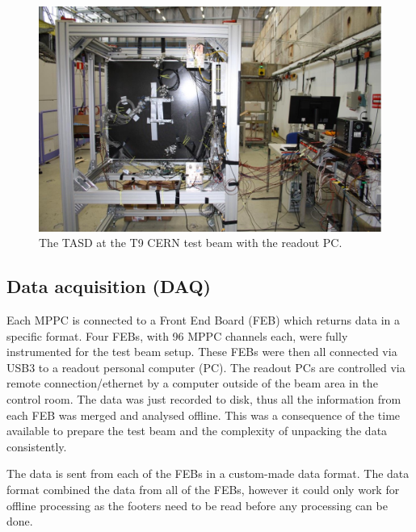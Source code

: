 \begin{figure}[h!]
\centering
\includegraphics[width=\textwidth]{figures/TASDinstrumented.jpeg}
\caption{The TASD at the T9 CERN test beam with the readout PC.}
\label{fig:TASDreal}
\end{figure}

\subsection{Data acquisition (DAQ)}
Each MPPC is connected to a Front End Board (FEB) which returns data in a specific format. Four FEBs, with 96 MPPC channels each, were fully instrumented for the test beam setup. These FEBs were then all connected via USB3 to a readout personal computer (PC). The readout PCs are controlled via remote connection/ethernet by a computer outside of the beam area in the control room. The data was just recorded to disk, thus all the information from each FEB was merged and analysed offline. This was a consequence of the time available to prepare the test beam and the complexity of unpacking the data consistently.


The data is sent from each of the FEBs in a custom-made data format. The data format combined the data from all of the FEBs, however it could only work for offline processing as the footers need to be read before any processing can be done.

